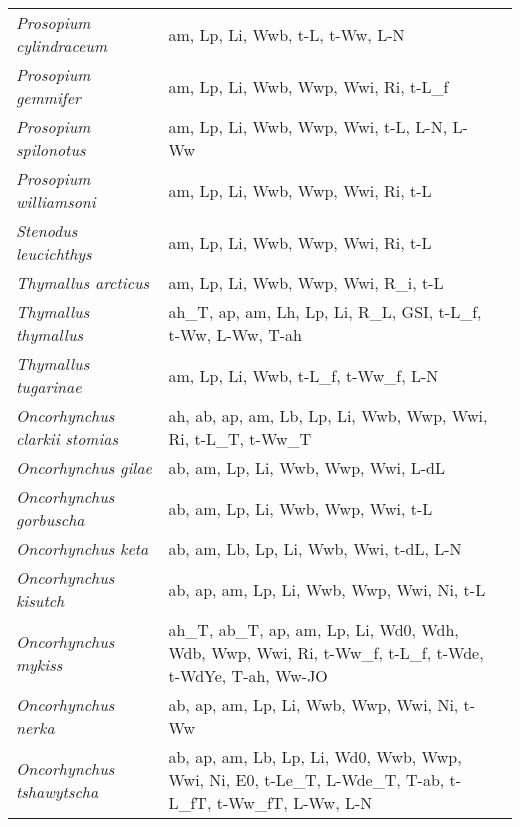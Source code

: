 {\begin{longtable}[c]{p{3.5cm}p{5.5cm}p{5.5cm}}
\emph{Prosopium cylindraceum} &  am, Lp, Li, Wwb, t-L, t-Ww, L-N & \citet{Shes2017} \\
\emph{Prosopium gemmifer} &  am, Lp, Li, Wwb, Wwp, Wwi, Ri, t-L\_f & \citet{FranCord1965,Shes2017} \\
\emph{Prosopium spilonotus} &  am, Lp, Li, Wwb, Wwp, Wwi, t-L, L-N, L-Ww & \citet{Thom2003,Shes2017} \\
\emph{Prosopium williamsoni} &  am, Lp, Li, Wwb, Wwp, Wwi, Ri, t-L & \citet{Shes2017,BenjWetz2014} \\
\emph{Stenodus leucichthys} &  am, Lp, Li, Wwb, Wwp, Wwi, Ri, t-L & \citet{Alt1973} \\
\emph{Thymallus arcticus} &  am, Lp, Li, Wwb, Wwp, Wwi, R\_i, t-L & \citet{CraiPoul1975} \\
\emph{Thymallus thymallus} &  ah\_T, ap, am, Lh, Lp, Li, R\_L, GSI, t-L\_f, t-Ww, L-Ww, T-ah & \citet{IngrIbbo20aa,Laak2008,Hell1969,JungWink1984} \\
\emph{Thymallus tugarinae} &  am, Lp, Li, Wwb, t-L\_f, t-Ww\_f, L-N & \citet{MikhOstr2013,MikhOstr2012} \\
\emph{Oncorhynchus clarkii stomias} &  ah, ab, ap, am, Lb, Lp, Li, Wwb, Wwp, Wwi, Ri, t-L\_T, t-Ww\_T & \citet{ColeFaus2007,Youn2009,ScarBerg1986,CartBeau1998} \\
\emph{Oncorhynchus gilae} &  ab, am, Lp, Li, Wwb, Wwp, Wwi, L-dL & \citet{Rinn1982} \\
\emph{Oncorhynchus gorbuscha} &  ab, am, Lp, Li, Wwb, Wwp, Wwi, t-L & \citet{LeBrPark1964} \\
\emph{Oncorhynchus keta} &  ab, am, Lb, Lp, Li, Wwb, Wwi, t-dL, L-N & \citet{Beac1982,UrbaKang2012} \\
\emph{Oncorhynchus kisutch} &  ab, ap, am, Lp, Li, Wwb, Wwp, Wwi, Ni, t-L & \citet{BretShel1975,Raym1986} \\
\emph{Oncorhynchus mykiss} &  ah\_T, ab\_T, ap, am, Lp, Li, Wd0, Wdh, Wdb, Wwp, Wwi, Ri, t-Ww\_f, t-L\_f, t-Wde, t-WdYe, T-ah, Ww-JO & \citet{FromRasm1991,DaviKenn2014,TylePott1996,Vels1987,NinnStev2006,YaniHisa2002,KieAls1998,Wie1985,LaufWood1996,SumpBail1991,WeatGill1980} \\
\emph{Oncorhynchus nerka} &  ab, ap, am, Lp, Li, Wwb, Wwp, Wwi, Ni, t-Ww & \citet{BretShel1975} \\
\emph{Oncorhynchus tshawytscha} &  ab, ap, am, Lb, Lp, Li, Wd0, Wwb, Wwp, Wwi, Ni, E0, t-Le\_T, L-Wde\_T, T-ab, t-L\_fT, t-Ww\_fT, L-Ww, L-N & \citet{BeacMurr1990,BergHend2001,JaspEven2006,BeacMurr1993,Hemi1982,ShelClar1995,ZabeAcho2004,AlleHass1985,OrsiJaen1996,EinuFlem2003} \\

\end{longtable}}
